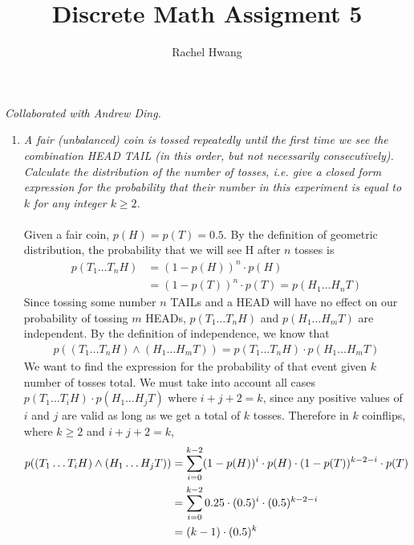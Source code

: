 \documentclass[a4paper]{article}
\title{Discrete Math Assigment 5}
\author{Rachel Hwang}
\begin{document}
\maketitle

\emph{Collaborated with Andrew Ding.}
\begin{enumerate}
\item \emph{A fair (unbalanced) coin is tossed repeatedly until the first time we see the combination HEAD TAIL (in this order, but not necessarily
consecutively). Calculate the distribution of the number of tosses, i.e.
give a closed form expression for the probability that their number in
this experiment is equal to $k$ for any integer $k \geq 2$.} \\
\\
Given a fair coin, $p(H) = p(T) = 0.5$. By the definition of geometric distribution, the probability that we will see H after $n$ tosses is 
\begin{align}
\nonumber p(T_1\dots T_nH) &= (1-p(H))^n \cdot p(H)\\
\nonumber &= (1-p(T))^n \cdot p(T) = p(H_1\dots H_nT)
\end{align}
Since tossing some number $n$ TAILs and a HEAD will have no effect on our probability of tossing $m$ HEADs, $p(T_1\dots T_{n}H)$ and $p(H_{1}\dots H_{m}T)$ are independent. By the definition of independence, we know that 
\begin{align}
\nonumber p((T_1\dots T_{n}H) \land (H_{1}\dots H_{m}T)) = p(T_1\dots T_{n}H) \cdot p(H_{1}\dots H_{m}T)
\end{align}
We want to find the expression for the probability of that event given $k$ number of tosses total. We must take into account all cases $p(T_1\dots T_{i}H) \cdot p(H_{1}\dots H_{j}T)$ where $i+j+2=k$, since any positive values of $i$ and $j$ are valid as long as we get a total of $k$ tosses. Therefore in $k$ coinflips, where $k \geq 2$ and $i+j+2=k$,
\begin{align}
\nonumber\displaystyle p((T_1\dots T_{i}H) \land (H_1\dots H_{j}T)) &= \sum\limits_{i=0}^{k-2}(1-p(H))^i \cdot p(H) \cdot (1-p(T))^{k-2-i} \cdot p(T) \\
\nonumber\displaystyle &= \sum\limits_{i=0}^{k-2} 0.25 \cdot (0.5)^i \cdot (0.5)^{k-2-i} \\
\nonumber &= (k-1) \cdot (0.5)^{k}
\end{align}
\\






\end{enumerate}
\end{document}
